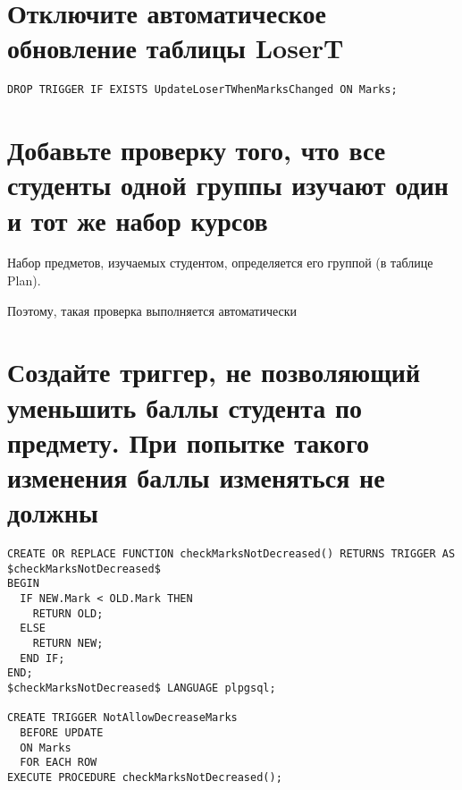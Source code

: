 \documentclass{article}
\begin{document}
\section{Отключите автоматическое обновление таблицы LoserT}

\begin{verbatim}
DROP TRIGGER IF EXISTS UpdateLoserTWhenMarksChanged ON Marks;
\end{verbatim}

\section{Добавьте проверку того, что все студенты одной группы изучают один и тот же набор курсов}

Набор предметов, изучаемых студентом, определяется его группой (в таблице Plan).

Поэтому, такая проверка выполняется автоматически

\section{Создайте триггер, не позволяющий уменьшить баллы студента по предмету. При попытке такого изменения баллы изменяться не должны}

\begin{verbatim}
CREATE OR REPLACE FUNCTION checkMarksNotDecreased() RETURNS TRIGGER AS
$checkMarksNotDecreased$
BEGIN
  IF NEW.Mark < OLD.Mark THEN
    RETURN OLD;
  ELSE
    RETURN NEW;
  END IF;
END;
$checkMarksNotDecreased$ LANGUAGE plpgsql;

CREATE TRIGGER NotAllowDecreaseMarks
  BEFORE UPDATE
  ON Marks
  FOR EACH ROW
EXECUTE PROCEDURE checkMarksNotDecreased();
\end{verbatim}
\end{document}
